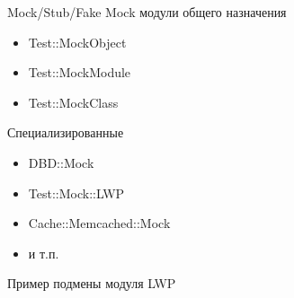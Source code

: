 \documentclass{beamer}
\begin{document}
\begin{frame}{Mock/Stub/Fake}
Mock модули общего назначения
\begin{itemize}
\item Test::MockObject
\item Test::MockModule
\item Test::MockClass
\end{itemize}
Специализированные
\begin{itemize}
\item DBD::Mock
\item Test::Mock::LWP
\item Cache::Memcached::Mock
\item и т.п.
\end{itemize}
\end{frame}

\begin{frame}[allowframebreaks]{Пример подмены модуля LWP}

\end{frame}

\begin{frame}

\end{frame}

\begin{frame}
\end{frame}

\begin{frame}
\end{frame}

\begin{frame}
\end{frame}

\begin{frame}
\end{frame}

\begin{frame}
\end{frame}

\begin{frame}
\end{frame}

\begin{frame}
\end{frame}

\begin{frame}
\end{frame}

\begin{frame}
\end{frame}
\end{document}
